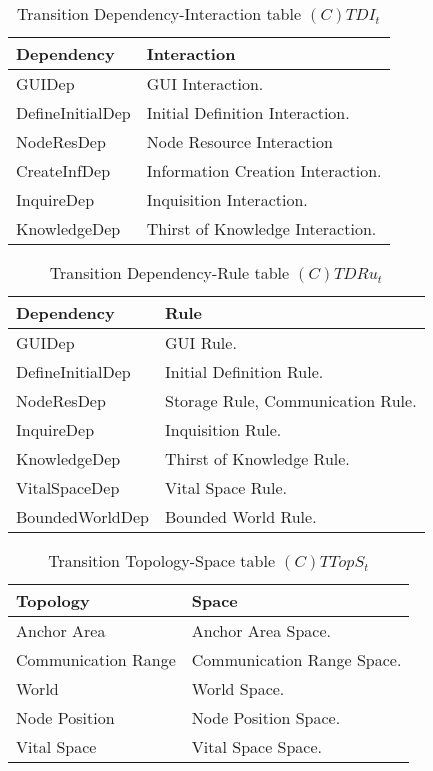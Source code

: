 \begin{table}[H]
	\centering
	\begin{tabular}{|p{4cm}|p{8cm}|}
			\hline
			\textbf{Dependency} & \textbf{Interaction} \\
			\hline
			GUIDep & GUI Interaction. \\
			\hline
			DefineInitialDep & Initial Definition Interaction. \\
			\hline
			NodeResDep & Node Resource Interaction \\
			\hline
			CreateInfDep & Information Creation Interaction. \\
			\hline
			InquireDep & Inquisition Interaction. \\
			\hline
			KnowledgeDep & Thirst of Knowledge Interaction. \\
			\hline
		\end{tabular}
	\caption{Transition Dependency-Interaction table $(C)TDI_t$}
	\label{tab:ctdit}
\end{table}

\begin{table}[H]
	\centering
	\begin{tabular}{|p{4cm}|p{8cm}|}
			\hline
			\textbf{Dependency} & \textbf{Rule} \\
			\hline
			GUIDep & GUI Rule. \\
			\hline
			DefineInitialDep & Initial Definition Rule. \\
			\hline
			NodeResDep & Storage Rule, Communication Rule. \\
			\hline
			InquireDep & Inquisition Rule. \\
			\hline
			KnowledgeDep & Thirst of Knowledge Rule. \\
			\hline
			VitalSpaceDep & Vital Space Rule. \\
			\hline
			BoundedWorldDep & Bounded World Rule. \\
			\hline
		\end{tabular}
	\caption{Transition Dependency-Rule table $(C)TDRu_t$}
	\label{tab:ctdrut}
\end{table}

\begin{table}[H]
	\centering
	\begin{tabular}{|p{4cm}|p{8cm}|}
			\hline
			\textbf{Topology} & \textbf{Space} \\
			\hline
			Anchor Area & Anchor Area Space.\\
			\hline
			Communication Range & Communication Range Space. \\
			\hline
			World & World Space. \\
			\hline
			Node Position & Node Position Space. \\
			\hline
			Vital Space & Vital Space Space. \\
			\hline
		\end{tabular}
	\caption{Transition Topology-Space table $(C)TTopS_t$}
	\label{tab:cttopst}
\end{table}

